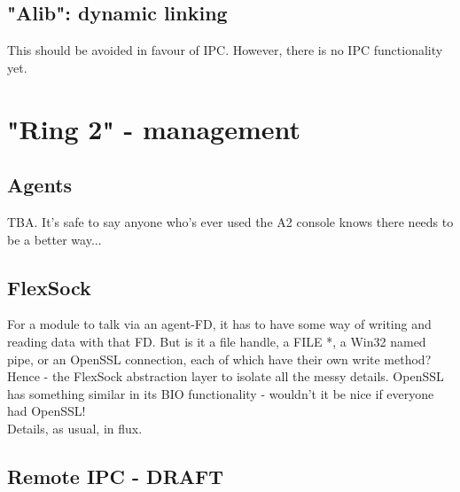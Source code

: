 \documentclass[a4paper,oneside,openany]{book}
\begin{document}
\subsection{"Alib": dynamic linking}
This should be avoided in favour of IPC. However, there is no IPC
functionality yet.
\section{"Ring 2" - management}
\subsection{Agents}
TBA. It's safe to say anyone who's ever used the A2 console knows there needs
to be a better way...
\subsection{FlexSock}
For a module to talk via an agent-FD, it has to have some way of writing and
reading data with that FD. But is it a file handle, a FILE *, a Win32 named
pipe, or an OpenSSL connection, each of which have their own write method?
\smallskip\\
Hence - the FlexSock abstraction layer to isolate all the messy details.
OpenSSL has something similar in its BIO functionality - wouldn't it be nice
if everyone had OpenSSL!
\smallskip\\
Details, as usual, in flux.
\subsection{Remote IPC - DRAFT}
\end{document}

